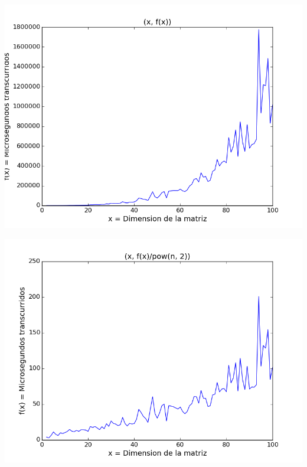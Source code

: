 \begin{center}
\includegraphics[scale=0.54]{images/2potenciafuncion}
\end{center}


\begin{center}
\includegraphics[scale=0.54]{images/2potenciasobrecuadrado}
\end{center}


